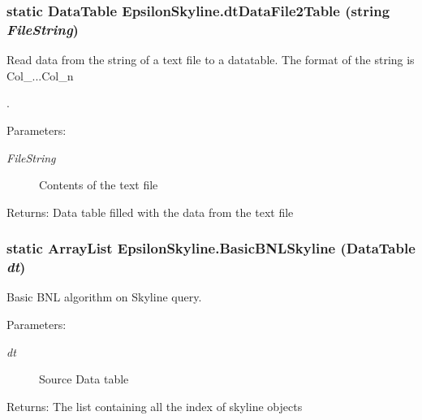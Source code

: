 \subsubsection{\setlength{\rightskip}{0pt plus 5cm}static Data\-Table Epsilon\-Skyline.dt\-Data\-File2Table (string {\em File\-String})\hspace{0.3cm}{\tt  [static, private]}}\label{class_epsilon_skyline_9accf2bf51afe01007f2ec6e2b0b1bd2}


Read data from the string of a text file to a datatable. The format of the string is Col\_...Col\_\-n\par
. 

\begin{Desc}
\item[Parameters:]
\begin{description}
\item[{\em File\-String}]Contents of the text file\end{description}
\end{Desc}
\begin{Desc}
\item[Returns:]Data table filled with the data from the text file\end{Desc}
\subsubsection{\setlength{\rightskip}{0pt plus 5cm}static Array\-List Epsilon\-Skyline.Basic\-BNLSkyline (Data\-Table {\em dt})\hspace{0.3cm}{\tt  [static, private]}}\label{class_epsilon_skyline_b6354c7ddc243f11e6c2d5eb9f16036c}


Basic BNL algorithm on Skyline query. 

\begin{Desc}
\item[Parameters:]
\begin{description}
\item[{\em dt}]Source Data table\end{description}
\end{Desc}
\begin{Desc}
\item[Returns:]The list containing all the index of skyline objects\end{Desc}

